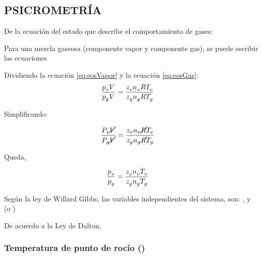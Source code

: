 
\subsection{PSICROMETRÍA}

De la ecuación del estado que describe el comportamiento de gases:
\eqEosWithZ

Para una mezcla gaseosa (componente  vapor y componente gas), se puede escribir las ecuaciones

\eqDoubleEosVaporGas

Dividiendo la ecuación \eqref{eq:eosVapor} y la ecuación \eqref{eq:eosGas}:
\begin{align}
    \frac{{\pVapor}{\volume[]{}[]}}{{\pGas}{\volume[]{}[]}} &= \frac{{\zVapor}{\vaporMole}{\universalConstantGas}{\tVapor}}{{\zGas}{\gasMole}{\universalConstantGas}{\tGas}}
\end{align}

Simplificando:

\begin{align}
    \frac{P_v \cancelC[1]{V}}{P_g \cancelC[1]{V}} &= \frac{z_v n_v \cancelC[2]{R} T_v}{z_g n_g \cancelC[2]{R} T_g}
\end{align}

Queda,

\begin{align}
    \frac{p_{\text{\ensuremath{{v}}}}^{}}{p_{\text{\ensuremath{{g}}}}^{}} &= \frac{{z}_{\text{\ensuremath{{v}}}}^{} {n}_{\text{\ensuremath{{v}}}}^{} {T}_{\text{\ensuremath{{v}}}}^{}}{{z}_{\text{\ensuremath{{g}}}}^{} {n}_{\text{\ensuremath{{g}}}}^{} {T}_{\text{\ensuremath{{g}}}}^{}}
\end{align}

Según la ley de Willard Gibbs, las variables independientes del sistema, son: \pTotal , \temperature[]{} y \pVapor (o \vaporMoleFraction)

\eqPhaseRule

De acuerdo a la Ley de Dalton,

\eqTotalPressure


\subsubsection{Temperatura de punto de rocío (\texorpdfstring{\tDewPoint}{Troc})}

